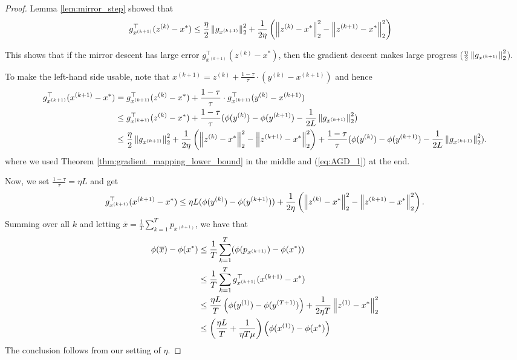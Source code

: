 \begin{proof}
Lemma \ref{lem:mirror_step} showed that
\begin{align}
g^{\top}_{x^{(k+1)}}(z^{(k)}-x^{*}) & \leq\frac{\eta}{2}\left\Vert g_{x^{(k+1)}}\right\Vert^{2}_{2}+\frac{1}{2\eta}\left(\left\Vert z^{(k)}-x^{*}\right\Vert^{2}_{2}-\left\Vert z^{(k+1)}-x^{*}\right\Vert^{2}_{2}\right)\label{eq:AGD_1}
\end{align}

This shows that if the mirror descent has large error $g^{\top}_{x^{(k+1)}}(z^{(k)}-x^{*})$,
then the gradient descent makes large progress ($\frac{\eta}{2}\left\Vert g_{x^{(k+1)}}\right\Vert^{2}_{2}$).

To make the left-hand side usable, note that $x^{(k+1)}=z^{(k)}+\frac{1-\tau}{\tau}\cdot(y^{(k)}-x^{(k+1)})$
and hence
\begin{align*}
g^{\top}_{x^{(k+1)}}(x^{(k+1)}-x^{*}) & =g^{\top}_{x^{(k+1)}}(z^{(k)}-x^{*})+\frac{1-\tau}{\tau}\cdot g^{\top}_{x^{(k+1)}}(y^{(k)}-x^{(k+1)})\\
 & \leq g^{\top}_{x^{(k+1)}}(z^{(k)}-x^{*})+\frac{1-\tau}{\tau}(\phi(y^{(k)})-\phi(y^{(k+1)})-\frac{1}{2L}\left\Vert g_{x^{(k+1)}}\right\Vert^{2}_{2})\\
 & \leq\frac{\eta}{2}\left\Vert g_{x^{(k+1)}}\right\Vert^{2}_{2}+\frac{1}{2\eta}\left(\left\Vert z^{(k)}-x^{*}\right\Vert^{2}_{2}-\left\Vert z^{(k+1)}-x^{*}\right\Vert^{2}_{2}\right)+\frac{1-\tau}{\tau}(\phi(y^{(k)})-\phi(y^{(k+1)})-\frac{1}{2L}\left\Vert g_{x^{(k+1)}}\right\Vert^{2}_{2}).
\end{align*}
where we used Theorem \ref{thm:gradient_mapping_lower_bound} in the
middle and (\ref{eq:AGD_1}) at the end.

Now, we set $\frac{1-\tau}{\tau}=\eta L$ and get
\[
g^{\top}_{x^{(k+1)}}(x^{(k+1)}-x^{*})\leq\eta L(\phi(y^{(k)})-\phi(y^{(k+1)}))+\frac{1}{2\eta}\left(\left\Vert z^{(k)}-x^{*}\right\Vert^{2}_{2}-\left\Vert z^{(k+1)}-x^{*}\right\Vert^{2}_{2}\right).
\]
Summing over all $k$ and letting $\overline{x}=\frac{1}{T}\sum^{T}_{k=1}p_{x^{(k+1)}}$,
we have that
\begin{align*}
\phi(\overline{x})-\phi(x^{*}) & \leq\frac{1}{T}\sum^{T}_{k=1}(\phi(p_{x^{(k+1)}})-\phi(x^{*}))\\
 & \leq\frac{1}{T}\sum^{T}_{k=1}g^{\top}_{x^{(k+1)}}(x^{(k+1)}-x^{*})\\
 & \leq\frac{\eta L}{T}\left(\phi(y^{(1)})-\phi(y^{(T+1)})\right)+\frac{1}{2\eta T}\left\Vert z^{(1)}-x^{*}\right\Vert^{2}_{2}\\
 & \leq\left(\frac{\eta L}{T}+\frac{1}{\eta T\mu}\right)\left(\phi(x^{(1)})-\phi(x^{*})\right)
\end{align*}
The conclusion follows from our setting of $\eta$.
\end{proof}

